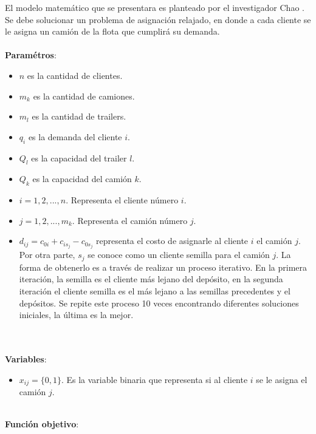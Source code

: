 \documentclass[letter, 10pt]{article}
\begin{document}
El modelo matemático que se presentara es planteado por el investigador Chao \cite{Chao}. Se debe solucionar un problema de asignación relajado, en donde a cada cliente se le asigna un camión de la flota que cumplirá su demanda.\\\\\textbf{Paramétros}:
\begin{itemize}
    \item $n$ es la cantidad de clientes.
    \item $m_{k}$ es la cantidad de camiones.
    \item $m_{l}$ es la cantidad de trailers.
    \item $q_{i}$ es la demanda del cliente $i$.
    \item $Q_{l}$ es la capacidad del trailer $l$.
    \item $Q_{k}$ es la capacidad del camión $k$.
    \item $i=1, 2,...,n$. Representa el cliente número $i$.
    \item $j= 1, 2,...,m_{k}$. Representa el camión número $j$.
    \item $d_{ij} = c_{0i} + c_{is_{j}} - c_{0s_{j}}$ representa el costo de asignarle al cliente $i$ el camión $j$. Por otra parte, $s_{j}$ se conoce como un cliente semilla para el camión $j$. La forma de obtenerlo es a través de realizar un proceso iterativo. En la primera iteración, la semilla es el cliente más lejano del depósito, en la segunda iteración el cliente semilla es el más lejano a las semillas precedentes y el depósitos. Se repite este proceso 10 veces encontrando diferentes soluciones iniciales, la última es la mejor.
\end{itemize}
\\
\\
\textbf{Variables}:
\begin{itemize}
    \item $x_{ij}=\{0,1\}$. Es la variable binaria que representa si al cliente $i$ se le asigna el camión $j$.
\end{itemize}
\\
\textbf{Función objetivo}:
\end{document}
